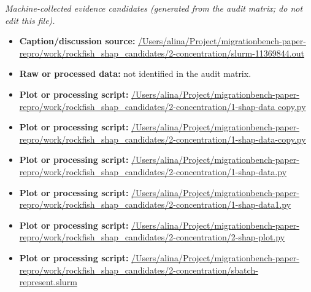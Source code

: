 \emph{Machine-collected evidence candidates (generated from the audit matrix; do not edit this file).}
\begin{itemize}[leftmargin=1.4em,noitemsep]
\item \textbf{Caption/discussion source:} \url{/Users/alina/Project/migrationbench-paper-repro/work/rockfish_shap_candidates/2-concentration/slurm-11369844.out}
\item \textbf{Raw or processed data:} not identified in the audit matrix.
\item \textbf{Plot or processing script:} \url{/Users/alina/Project/migrationbench-paper-repro/work/rockfish_shap_candidates/2-concentration/1-shap-data copy.py}
\item \textbf{Plot or processing script:} \url{/Users/alina/Project/migrationbench-paper-repro/work/rockfish_shap_candidates/2-concentration/1-shap-data-copy.py}
\item \textbf{Plot or processing script:} \url{/Users/alina/Project/migrationbench-paper-repro/work/rockfish_shap_candidates/2-concentration/1-shap-data.py}
\item \textbf{Plot or processing script:} \url{/Users/alina/Project/migrationbench-paper-repro/work/rockfish_shap_candidates/2-concentration/1-shap-data1.py}
\item \textbf{Plot or processing script:} \url{/Users/alina/Project/migrationbench-paper-repro/work/rockfish_shap_candidates/2-concentration/2-shap-plot.py}
\item \textbf{Plot or processing script:} \url{/Users/alina/Project/migrationbench-paper-repro/work/rockfish_shap_candidates/2-concentration/sbatch-represent.slurm}
\end{itemize}

